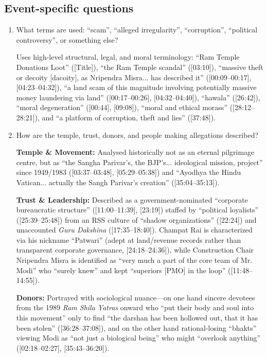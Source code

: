 \documentclass[10pt,a4paper]{article}
\begin{document}
\subsection*{Event-specific questions}
\begin{enumerate}[leftmargin=1.5em, itemsep=6pt, topsep=4pt]
  \item What terms are used: ``scam'', ``alleged irregularity'', ``corruption'', ``political controversy'', or something else?\par\smallskip
  Uses high-level structural, legal, and moral terminology: ``Ram Temple Donations Loot'' ([Title]), ``the Ram Temple scandal'' ([03:10]), ``massive theft or decoity [dacoity], as Nripendra Misra... has described it'' ([00:09--00:17], [04:23--04:32]), ``a land scam of this magnitude involving potentially massive money laundering via land'' ([00:17--00:26], [04:32--04:40]), ``hawala'' ([26:42]), ``moral degeneration'' ([00:44], [09:08]), ``moral and ethical morass'' ([28:12--28:21]), and ``a platform of corruption, theft and lies'' ([37:48]).
  \item How are the temple, trust, donors, and people making allegations described?\par\smallskip
  \textbf{Temple \& Movement:} Analysed historically not as an eternal pilgrimage centre, but as ``the Sangha Parivar's, the BJP's... ideological mission, project'' since 1949/1983 ([03:37--03:48], [05:29--05:38]) and ``Ayodhya the Hindu Vatican... actually the Sangh Parivar's creation'' ([35:04--35:13]).

  \textbf{Trust \& Leadership:} Described as a government-nominated ``corporate bureaucratic structure'' ([11:00--11:39], [23:19]) staffed by ``political loyalists'' ([25:39--25:48]) from an RSS culture of ``shadow organizations'' ([22:24]) and unaccounted \emph{Guru Dakshina} ([17:35--18:40]). Champat Rai is characterized via his nickname ``Patwari'' (adept at land/revenue records rather than transparent corporate governance, [24:18--24:36]), while Construction Chair Nripendra Misra is identified as ``very much a part of the core team of Mr. Modi'' who ``surely knew'' and kept ``superiors [PMO] in the loop'' ([11:48--14:55]).

  \textbf{Donors:} Portrayed with sociological nuance---on one hand sincere devotees from the 1989 \emph{Ram Shila Yatras} onward who ``put their body and soul into this movement'' only to find ``the darshan has been hollowed out, that it has been stolen'' ([36:28--37:08]), and on the other hand rational-losing ``bhakts'' viewing Modi as ``not just a biological being'' who might ``overlook anything'' ([02:18--02:27], [35:43--36:20]).


\end{enumerate}
\end{document}
